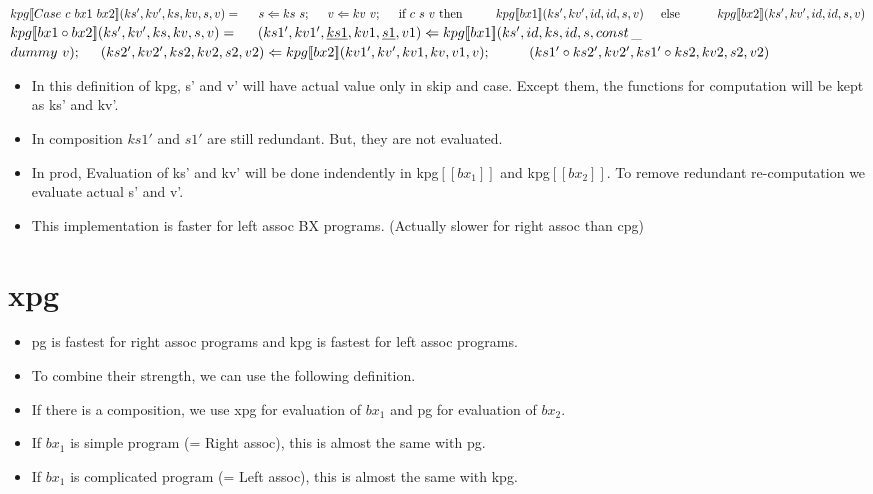 \documentclass[runningheads]{llncs}
\newcommand{\tab}{\hspace*{5mm}}
\newcommand{\qtab}{\hspace*{5mm} \ \quad}
\newcommand{\kpg}[7]{kpg [\![#1]\!] (#2, #3, #4, #5, #6, #7)}
\begin{document}
$\kpg{Case \ c \ bx1 \ bx2}{ks'}{kv'}{ks}{kv}{s}{v} =\\
    \tab s \Leftarrow ks \ s;\\
    \tab v \Leftarrow kv \ v;\\
    \tab \text{if} \ c \ s \ v \ \text{then}\\
        \qtab \kpg{bx1}{ks'}{kv'}{id}{id}{s}{v}\\
    \tab \text{else}\\\
        \qtab \kpg{bx2}{ks'}{kv'}{id}{id}{s}{v}$\\

$\kpg{bx1 \circ bx2}{ks'}{kv'}{ks}{kv}{s}{v} =\\
    \tab (ks1', kv1', \underline{ks1}, kv1, \underline{s1}, v1) \Leftarrow \kpg{bx1}{ks'}{id}{ks}{id}{s}{const$\_$dummy \ v};\\
    \tab (ks2', kv2', ks2, kv2, s2, v2) \Leftarrow \kpg{bx2}{kv1'}{kv'}{kv1}{kv}{v1}{v};\\
    \qtab (ks1' \circ ks2', kv2', ks1' \circ ks2, kv2, s2, v2)$

\begin{itemize}
\item In this definition of kpg, s' and v' will have actual value only in skip and case. Except them, the functions for computation will be kept as ks' and kv'.
\item In composition $ks1'$ and $s1'$ are still redundant. But, they are not evaluated.
\item In prod, Evaluation of ks' and kv' will be done indendently in kpg$[\![bx_1]\!]$ and kpg$[\![bx_2]\!]$. To remove redundant re-computation we evaluate actual s' and v'.
\item This implementation is faster for left assoc BX programs. (Actually slower for right assoc than cpg)
\end{itemize}

\section{xpg}

\begin{itemize}
\item pg is fastest for right assoc programs and kpg is fastest for left assoc programs.
\item To combine their strength, we can use the following definition.
\item If there is a composition, we use xpg for evaluation of $bx_1$ and pg for evaluation of $bx_2$.
\item If $bx_1$ is simple program (= Right assoc), this is almost the same with pg.
\item If $bx_1$ is complicated program (= Left assoc), this is almost the same with kpg.
\end{itemize}
\end{document}
